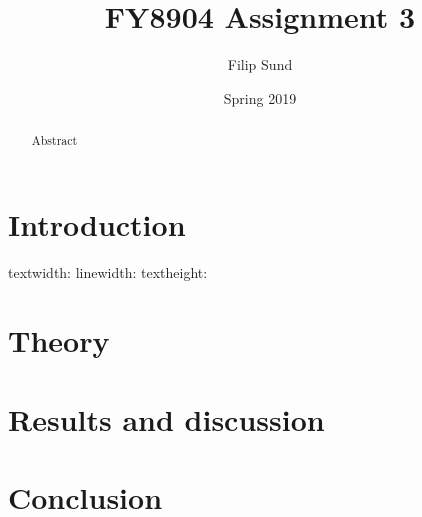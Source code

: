 \documentclass[a4paper]{article}
\title{FY8904 Assignment 3}
\date{Spring 2019}
\author{Filip Sund}
\begin{document}
\maketitle

\begin{abstract}
    Abstract
\end{abstract}

\section*{Introduction}

textwidth: \prntlen{\textwidth}
linewidth: \prntlen{\linewidth}
textheight: \prntlen{\textheight}

\cite{powell1970hybrid}

\section*{Theory}


\section*{Results and discussion}


\section*{Conclusion}

\printbibliography[title=References]
\end{document}
